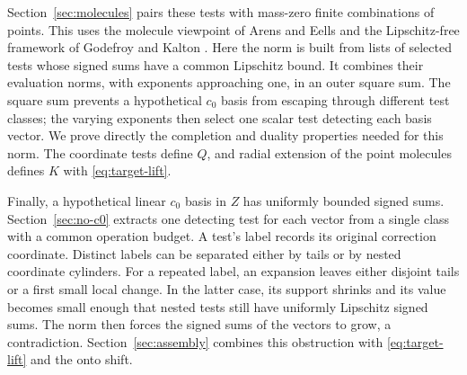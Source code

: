 Section~\ref{sec:molecules} pairs these tests with mass-zero finite
combinations of points. This uses the molecule viewpoint of Arens and
Eells \cite[Section~2]{AE56} and the Lipschitz-free framework of
Godefroy and Kalton \cite[Sections~1--2]{GK03}. Here the norm is built
from lists of selected tests whose signed sums have a common
Lipschitz bound. It combines their evaluation norms, with exponents
approaching one, in an outer square sum. The square sum prevents a
hypothetical \(c_0\) basis from escaping through different test
classes; the varying exponents then select one scalar test detecting
each basis vector. We prove directly the completion and duality
properties needed for this norm. The coordinate tests define \(Q\),
and radial extension of the point molecules defines \(K\) with
\eqref{eq:target-lift}.

Finally, a hypothetical linear \(c_0\) basis in \(Z\) has uniformly
bounded signed sums. Section~\ref{sec:no-c0} extracts one detecting
test for each vector from a single class with a common operation
budget. A test's label records its original correction coordinate.
Distinct labels can be
separated either by tails or by nested coordinate cylinders. For a
repeated label, an expansion leaves either disjoint tails or a first
small local change. In the latter case, its support shrinks and its
value becomes small enough that nested tests still have uniformly
Lipschitz signed sums. The norm then forces
the signed sums of the vectors to grow, a contradiction.
Section~\ref{sec:assembly} combines this obstruction with \eqref{eq:target-lift} and
the onto shift.
